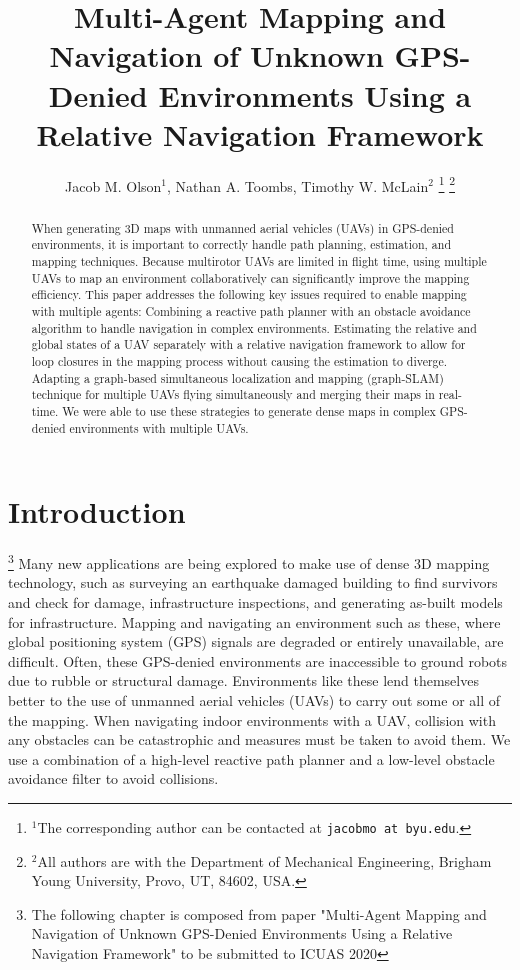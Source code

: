 \documentclass[letterpaper, 10 pt, conference]{ieeeconf}  %
\title{\LARGE \bf
Multi-Agent Mapping and Navigation of Unknown GPS-Denied Environments Using a Relative Navigation Framework}
\author{Jacob M. Olson$^{1}$, Nathan A. Toombs, Timothy W. McLain$^{2}$%
\thanks{$^{1}$The corresponding author can be contacted at
        {\tt\small jacobmo at byu.edu}.}%
\thanks{$^{2}$All authors are with the Department of Mechanical Engineering,
        Brigham Young University, Provo, UT, 84602, USA.}%
}
\begin{document}
\maketitle
\thispagestyle{empty}
\pagestyle{empty}

\graphicspath{{figures/}}

\begin{abstract}

When generating 3D maps with unmanned aerial vehicles (UAVs) in GPS-denied environments, it is important to correctly handle path planning, estimation, and mapping techniques. Because multirotor UAVs are limited in flight time, using multiple UAVs to map an environment collaboratively can significantly improve the mapping efficiency. This paper addresses the following key issues required to enable mapping with multiple agents: Combining a reactive path planner with an obstacle avoidance algorithm to handle navigation in complex environments. Estimating the relative and global states of a UAV separately with a relative navigation framework to allow for loop closures in the mapping process without causing the estimation to diverge. Adapting a graph-based simultaneous localization and mapping (graph-SLAM) technique for multiple UAVs flying simultaneously and merging their maps in real-time. We were able to use these strategies to generate dense maps in complex GPS-denied environments with multiple UAVs.

\end{abstract}

\section{Introduction}

\footnote{The following chapter is composed from paper "Multi-Agent Mapping and Navigation of Unknown GPS-Denied Environments Using a Relative Navigation Framework" to be submitted to ICUAS 2020} Many new applications are being explored to make use of dense 3D mapping technology, such as surveying an earthquake damaged building to find survivors and check for damage, infrastructure inspections, and generating as-built models for infrastructure. Mapping and navigating an environment such as these, where global positioning system (GPS) signals are degraded or entirely unavailable, are difficult. Often, these GPS-denied environments are inaccessible to ground robots due to rubble or structural damage. Environments like these lend themselves better to the use of unmanned aerial vehicles (UAVs) to carry out some or all of the mapping. When navigating indoor environments with a UAV, collision with any obstacles can be catastrophic and measures must be taken to avoid them. We use a combination of a high-level reactive path planner and a low-level obstacle avoidance filter to avoid collisions.
\end{document}
